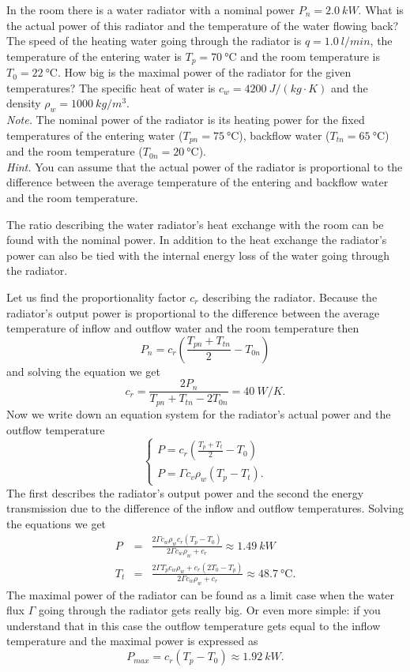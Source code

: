 {\ifEngStatement
In the room there is a water radiator with a nominal power $P_{n}=\SI{2.0}{kW}$. What is the actual power of this radiator and the temperature of the water flowing back? The speed of the heating water going through the radiator is $q=\SI{1.0}{l/min}$, the temperature of the entering water is $T_{p}=\SI{70}{\celsius}$ and the room temperature is $T_{0}=\SI{22}{\celsius}$.  How big is the maximal power of the radiator for the given temperatures? The specific heat of water is $c_{w}=\SI{4200}{J/\left(kg\cdot K\right)}$ and the density $\rho_{w}=\SI{1000}{kg/m^{3}}$.\\ 
\emph{Note.} The nominal power of the radiator is its heating power for the fixed temperatures of the entering water ($T_{pn}=\SI{75}{\celsius}$), backflow water ($T_{tn}=\SI{65}{\celsius}$) and the room temperature ($T_{0n}=\SI{20}{\celsius}$).\\
\emph{Hint.} You can assume that the actual power of the radiator is proportional to the difference between the average temperature of the entering and backflow water and the room temperature.
\fi


\ifEngHint
The ratio describing the water radiator’s heat exchange with the room can be found with the nominal power. In addition to the heat exchange the radiator’s power can also be tied with the internal energy loss of the water going through the radiator. 
\fi


\ifEngSolution
Let us find the proportionality factor $c_{r}$ describing the radiator. Because the radiator’s output power is proportional to the difference between the average temperature of inflow and outflow water and the room temperature then
\[
P_{n}=c_{r}\left(\frac{T_{pn}+T_{tn}}{2}-T_{0n}\right)
\]
and solving the equation we get
\[
c_{r}=\frac{2P_{n}}{T_{pn}+T_{tn}-2T_{0n}}=\SI{40}{W/K}.
\]
Now we write down an equation system for the radiator’s actual power and the outflow temperature
\[
\left\{ \begin{array}{c}
P=c_{r}\left(\frac{T_{p}+T_{t}}{2}-T_{0}\right)\\
P=\Gamma c_{v}\rho_{w}\left(T_{p}-T_{t}\right).
\end{array}\right.
\]
The first describes the radiator’s output power and the second the energy transmission due to the difference of the inflow and outflow temperatures. Solving the equations we get
\begin{eqnarray*}
P & = & \frac{2\Gamma c_{w}\rho_{w}c_{r}\left(T_{p}-T_{0}\right)}{2\Gamma c_{w}\rho_{w}+c_{r}}\approx\SI{1.49}{kW}\\
T_{t} & = & \frac{2\Gamma T_{p}c_{w}\rho_{w}+c_{r}\left(2T_{0}-T_{p}\right)}{2\Gamma c_{w}\rho_{w}+c_{r}}\approx\SI{48.7}{\celsius}.
\end{eqnarray*}
The maximal power of the radiator can be found as a limit case when the water flux $\Gamma$ going through the radiator gets really big. Or even more simple: if you understand that in this case the outflow temperature gets equal to the inflow temperature and the maximal power is expressed as 
\[
P_{max}=c_{r}\left(T_{p}-T_{0}\right)\approx\SI{1.92}{kW}.
\]
\fi
}